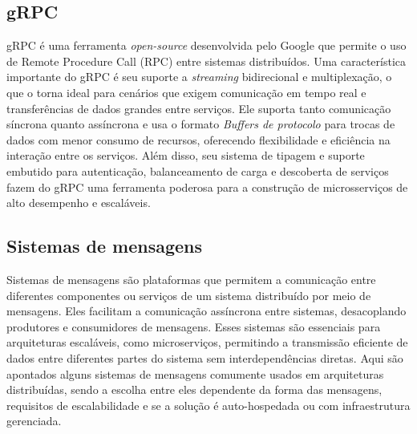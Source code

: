 \subsection{gRPC}

gRPC é uma ferramenta \emph{open-source} desenvolvida pelo Google que permite o uso de Remote Procedure Call (RPC) entre sistemas distribuídos. Uma característica importante do gRPC é seu suporte a \emph{streaming} bidirecional e multiplexação, o que o torna ideal para cenários que exigem comunicação em tempo real e transferências de dados grandes entre serviços. Ele suporta tanto comunicação síncrona quanto assíncrona e usa o formato \emph{Buffers de protocolo} para trocas de dados com menor consumo de recursos, oferecendo flexibilidade e eficiência na interação entre os serviços. 
Além disso, seu sistema de tipagem e suporte embutido para autenticação, balanceamento de carga e descoberta de serviços fazem do gRPC uma ferramenta poderosa para a construção de microsserviços de alto desempenho e escaláveis. \cite{grpc}

\subsection{Sistemas de mensagens}
Sistemas de mensagens são plataformas que permitem a comunicação entre diferentes componentes ou serviços de um sistema distribuído por meio de mensagens. Eles facilitam a comunicação assíncrona entre sistemas, desacoplando produtores e consumidores de mensagens. Esses sistemas são essenciais para arquiteturas escaláveis, como microserviços, permitindo a transmissão eficiente de dados entre diferentes partes do sistema sem interdependências diretas. Aqui são apontados alguns sistemas de mensagens comumente usados em arquiteturas distribuídas, sendo a escolha entre eles dependente da forma das mensagens, requisitos de escalabilidade e se a solução é auto-hospedada ou com infraestrutura gerenciada.


